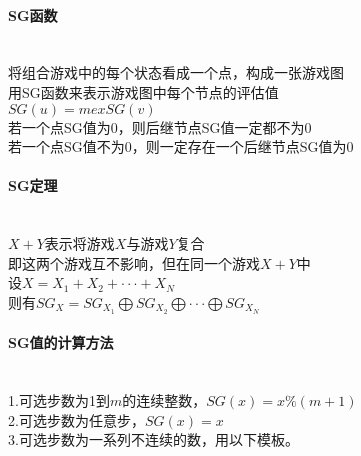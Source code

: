 \paragraph{SG函数}~{}
\\
将组合游戏中的每个状态看成一个点，构成一张游戏图\\
用SG函数来表示游戏图中每个节点的评估值\\
$SG(u) = mex{SG(v)}$\\
若一个点SG值为0，则后继节点SG值一定都不为0\\
若一个点SG值不为0，则一定存在一个后继节点SG值为0\\

\paragraph{SG定理}~{}
\\
$X+Y$表示将游戏$X$与游戏$Y$复合\\
即这两个游戏互不影响，但在同一个游戏$X+Y$中\\
设$X=X_{1}+X_{2}+ \cdot \cdot \cdot +X_{N}$\\
则有$SG_{X}=SG_{X_{1}} \bigoplus SG_{X_{2}} \bigoplus \cdot \cdot \cdot \bigoplus SG_{X_{N}}$\\

\paragraph{SG值的计算方法}~{}
\\
1.可选步数为1到$m$的连续整数，$SG(x) = x \% (m + 1)$\\
2.可选步数为任意步，$SG(x) = x$\\
3.可选步数为一系列不连续的数，用以下模板。\\
